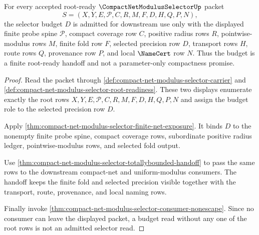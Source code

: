 \begin{theorem}
\label{thm:compact-net-modulus-selector-root-budget-admission}
For every accepted root-ready $\CompactNetModulusSelectorUp$ packet
$$
S=(X,Y,E,\mathcal{P},C,R,M,F,D,H,Q,P,N),
$$
the selector budget $D$ is admitted for downstream use only with the displayed finite probe spine $\mathcal{P}$, compact coverage row $C$, positive radius rows $R$, pointwise-modulus rows $M$, finite fold row $F$, selected precision row $D$, transport rows $H$, route rows $Q$, provenance row $P$, and local $\NameCert$ row $N$. Thus the budget is a finite root-ready handoff and not a parameter-only compactness promise.
\end{theorem}
\begin{proof}
Read the packet through \autoref{def:compact-net-modulus-selector-carrier} and \autoref{def:compact-net-modulus-selector-root-readiness}. These two displays enumerate exactly the root rows $X,Y,E,\mathcal{P},C,R,M,F,D,H,Q,P,N$ and assign the budget role to the selected precision row $D$.

Apply \autoref{thm:compact-net-modulus-selector-finite-net-exposure}. It binds $D$ to the nonempty finite probe spine, compact coverage rows, subordinate positive radius ledger, pointwise-modulus rows, and selected fold output.

Use \autoref{thm:compact-net-modulus-selector-totallybounded-handoff} to pass the same rows to the downstream compact-net and uniform-modulus consumers. The handoff keeps the finite fold and selected precision visible together with the transport, route, provenance, and local naming rows.

Finally invoke \autoref{thm:compact-net-modulus-selector-consumer-nonescape}. Since no consumer can leave the displayed packet, a budget read without any one of the root rows is not an admitted selector read.
\end{proof}

